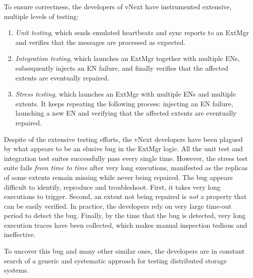 To ensure correctness, the developers of vNext have instrumented extensive, multiple levels of testing:
\begin{enumerate}
\item \emph{Unit testing}, which sends emulated heartbeats and sync reports to an ExtMgr and verifies that the messages are processed as expected.

\item \emph{Integration testing}, which launches an ExtMgr together with multiple ENs, subsequently injects an EN failure, and finally verifies that the affected extents are eventually repaired.

\item \emph{Stress testing}, which launches an ExtMgr with multiple ENs and multiple extents. It keeps repeating the following process: injecting an EN failure, launching a new EN and verifying that the affected extents are eventually repaired.
\end{enumerate}

Despite of the extensive testing efforts, the vNext developers have been plagued by what appears to be an elusive bug in the ExtMgr logic. All the unit test and integration test suites successfully pass every single time. However, the stress test suite fails {\em from time to time} after very long executions, manifested as the replicas of some extents remain missing while never being repaired. The bug appears difficult to identify, reproduce and troubleshoot. First, it takes very long executions to trigger. Second, an extent not being repaired is {\em not} a property that can be easily verified. In practice, the developers rely on very large time-out period to detect the bug. Finally, by the time that the bug is detected, very long execution traces have been collected, which makes manual inspection tedious and ineffective.

To uncover this bug and many other similar ones, the developers are in constant search of a generic and systematic approach for testing distributed storage systems.

